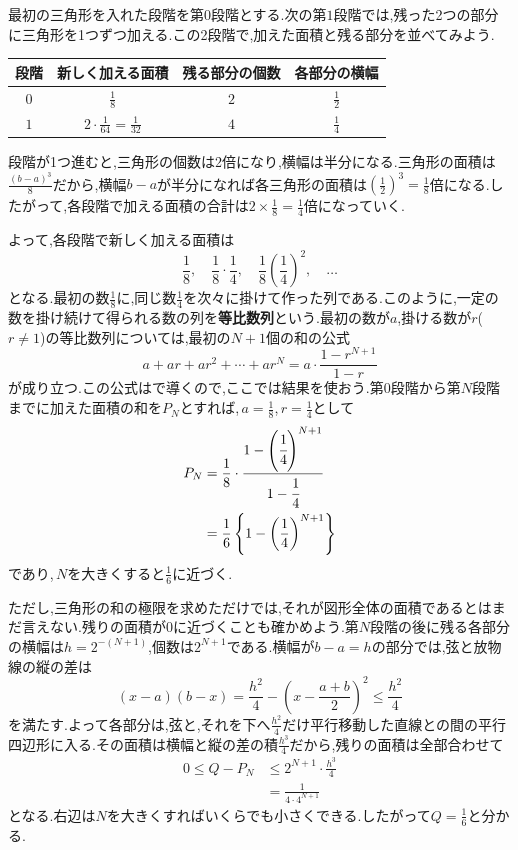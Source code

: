 最初の三角形を入れた段階を第$0$段階とする.次の第$1$段階では,残った2つの部分に三角形を1つずつ加える.この2段階で,加えた面積と残る部分を並べてみよう.
\begin{center}
\begin{tabular}{cccc}
\toprule
段階 & 新しく加える面積 & 残る部分の個数 & 各部分の横幅\\
\midrule
$0$ & $\frac18$ & $2$ & $\frac12$\\[3pt]
$1$ & $2\cdot\frac1{64}=\frac1{32}$ & $4$ & $\frac14$\\
\bottomrule
\end{tabular}
\end{center}
段階が1つ進むと,三角形の個数は2倍になり,横幅は半分になる.三角形の面積は$\frac{(b-a)^3}{8}$だから,横幅$b-a$が半分になれば各三角形の面積は$\left(\frac12\right)^3=\frac18$倍になる.したがって,各段階で加える面積の合計は$2\times\frac18=\frac14$倍になっていく.

よって,各段階で新しく加える面積は
\[
 \frac18,\quad\frac18\cdot\frac14,\quad\frac18\left(\frac14\right)^2,\quad\ldots
\]
となる.最初の数$\frac18$に,同じ数$\frac14$を次々に掛けて作った列である.このように,一定の数を掛け続けて得られる数の列を\textbf{等比数列}という.最初の数が$a$,掛ける数が$r$($r\ne1$)の等比数列については,最初の$N+1$個の和の公式
\[
 a+ar+ar^2+\cdots+ar^N=a\cdot\frac{1-r^{N+1}}{1-r}
\]
が成り立つ.この公式はで導くので,ここでは結果を使おう.第$0$段階から第$N$段階までに加えた面積の和を$P_N$とすれば,\,$a=\frac18$,\,$r=\frac14$として
\begin{align*}
 P_N&=\frac18\cdot\cfrac{1-\left(\cfrac14\right)^{N+1}}{1-\cfrac14}\\
 &=\frac16\left\{1-\left(\frac14\right)^{N+1}\right\}
\end{align*}
であり,\,$N$を大きくすると$\frac16$に近づく.

ただし,三角形の和の極限を求めただけでは,それが図形全体の面積であるとはまだ言えない.残りの面積が$0$に近づくことも確かめよう.第$N$段階の後に残る各部分の横幅は$h=2^{-(N+1)}$,個数は$2^{N+1}$である.横幅が$b-a=h$の部分では,弦と放物線の縦の差は
\[
 (x-a)(b-x)=\frac{h^2}4-\left(x-\frac{a+b}2\right)^2\le\frac{h^2}4
\]
を満たす.よって各部分は,弦と,それを下へ$\frac{h^2}{4}$だけ平行移動した直線との間の平行四辺形に入る.その面積は横幅と縦の差の積$\frac{h^3}{4}$だから,残りの面積は全部合わせて
\begin{align*}
 0\le Q-P_N&\le2^{N+1}\cdot\frac{h^3}{4}\\
 &=\frac1{4\cdot4^{N+1}}
\end{align*}
となる.右辺は$N$を大きくすればいくらでも小さくできる.したがって$Q=\frac16$と分かる.

